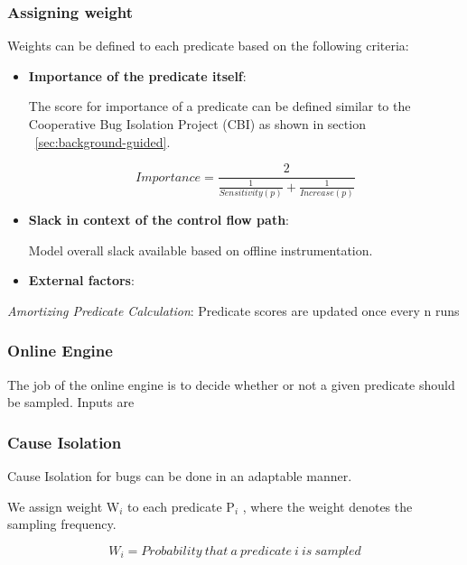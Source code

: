 \subsubsection{Assigning weight}

Weights can be defined to each predicate based on the following criteria:

\begin{itemize}
	
	\item \textbf{Importance of the predicate itself}: 
	
	The score for importance of a predicate can be defined similar to the Cooperative Bug Isolation Project (CBI) as shown in section ~\ref{sec:background-guided}. 
	
	\begin{equation}
	\label{eq:importance}
	Importance = \frac{2}{\frac{1}{Sensitivity(p)}+\frac{1}{Increase(p)}}
	\end{equation}
	
	
	\item \textbf{Slack in context of the control flow path}: 
	
	Model overall slack available based on offline instrumentation. 
	
	\item \textbf{External factors}:
	
\end{itemize}

\textit{Amortizing Predicate Calculation}: Predicate scores are updated once every n runs

\subsubsection{Online Engine}

The job of the online engine is to decide whether or not a given predicate should be sampled. 
Inputs are 


\subsubsection{Cause Isolation}
\label{sec:cause_isolation}

Cause Isolation for bugs can be done in an adaptable manner. 

We assign weight W$_{i}$ to each predicate P$_{i}$ , where the weight denotes the sampling frequency.

\begin{equation}
W_{i} = Probability\ that\ a\ predicate\ i\ is\ sampled
\end{equation}

